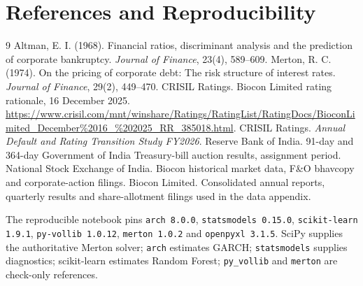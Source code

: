 \documentclass[10pt,a4paper]{article}
\begin{document}
\section{References and Reproducibility}
\begin{thebibliography}{9}
 Altman, E. I. (1968). Financial ratios, discriminant analysis and the prediction of corporate bankruptcy. \textit{Journal of Finance}, 23(4), 589--609.
 Merton, R. C. (1974). On the pricing of corporate debt: The risk structure of interest rates. \textit{Journal of Finance}, 29(2), 449--470.
 CRISIL Ratings. Biocon Limited rating rationale, 16 December 2025. \url{https://www.crisil.com/mnt/winshare/Ratings/RatingList/RatingDocs/BioconLimited_December%2016_%202025_RR_385018.html}.
 CRISIL Ratings. \textit{Annual Default and Rating Transition Study FY2026}.
 Reserve Bank of India. 91-day and 364-day Government of India Treasury-bill auction results, assignment period.
 National Stock Exchange of India. Biocon historical market data, F\&O bhavcopy and corporate-action filings.
 Biocon Limited. Consolidated annual reports, quarterly results and share-allotment filings used in the data appendix.
\end{thebibliography}

The reproducible notebook pins \texttt{arch 8.0.0}, \texttt{statsmodels 0.15.0}, \texttt{scikit-learn 1.9.1}, \texttt{py-vollib 1.0.12}, \texttt{merton 1.0.2} and \texttt{openpyxl 3.1.5}. SciPy supplies the authoritative Merton solver; \texttt{arch} estimates GARCH; \texttt{statsmodels} supplies diagnostics; scikit-learn estimates Random Forest; \texttt{py\_vollib} and \texttt{merton} are check-only references.
\end{document}

